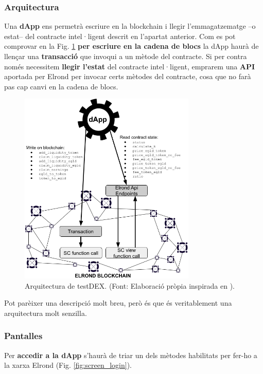 \documentclass[11pt,a4paper]{article}
\begin{document}
\subsubsection{Arquitectura}

Una \textbf{dApp} ens permetrà escriure en la blockchain i llegir l'emmagatzematge –o estat– del contracte intel·ligent descrit en l'apartat anterior. Com es pot comprovar en la Fig. \ref{fig:architecture} \textbf{per escriure en la cadena de blocs} la dApp haurà de llençar una \textbf{transacció} que invoqui a un mètode del contracte. Si per contra només necessitem \textbf{llegir l'estat} del contracte intel·ligent, emprarem una \textbf{API} aportada per Elrond per invocar certs mètodes del contracte, cosa que no farà pas cap canvi en la cadena de blocs.

\begin{figure}[h]
\includegraphics[width=0.75\textwidth]{architecture.png}
\centering
\caption{Arquitectura de testDEX. (Font: Elaboració pròpia inspirada en \cite{elrond2022}).}\label{fig:architecture}
\end{figure} 

Pot parèixer una descripció molt breu, però és que és veritablement una arquitectura molt senzilla.

\subsubsection{Pantalles}

Per \textbf{accedir a la dApp} s'haurà de triar un dels mètodes habilitats per fer-ho a la xarxa Elrond (Fig. \ref{fig:screen_login}).
\end{document}
